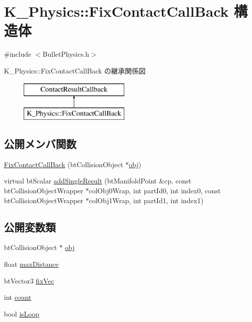 \hypertarget{struct_k___physics_1_1_fix_contact_call_back}{}\section{K\+\_\+\+Physics\+:\+:Fix\+Contact\+Call\+Back 構造体}
\label{struct_k___physics_1_1_fix_contact_call_back}


{\ttfamily \#include $<$Bullet\+Physics.\+h$>$}

K\+\_\+\+Physics\+:\+:Fix\+Contact\+Call\+Back の継承関係図\begin{figure}[H]
\begin{center}
\leavevmode
\includegraphics[height=2.000000cm]{struct_k___physics_1_1_fix_contact_call_back}
\end{center}
\end{figure}
\subsection*{公開メンバ関数}
\begin{DoxyCompactItemize}
\item 
\mbox{\hyperlink{struct_k___physics_1_1_fix_contact_call_back_aaa5c9013bf57d2196b55654bcdf360d3}{Fix\+Contact\+Call\+Back}} (bt\+Collision\+Object $\ast$\mbox{\hyperlink{struct_k___physics_1_1_fix_contact_call_back_ae632dff95a587e5cb73f5bbadf290a83}{obj}})
\item 
virtual bt\+Scalar \mbox{\hyperlink{struct_k___physics_1_1_fix_contact_call_back_ad6f9dd66fd4b001dfd4b687c18c16021}{add\+Single\+Result}} (bt\+Manifold\+Point \&cp, const bt\+Collision\+Object\+Wrapper $\ast$col\+Obj0\+Wrap, int part\+Id0, int index0, const bt\+Collision\+Object\+Wrapper $\ast$col\+Obj1\+Wrap, int part\+Id1, int index1)
\end{DoxyCompactItemize}
\subsection*{公開変数類}
\begin{DoxyCompactItemize}
\item 
bt\+Collision\+Object $\ast$ \mbox{\hyperlink{struct_k___physics_1_1_fix_contact_call_back_ae632dff95a587e5cb73f5bbadf290a83}{obj}}
\item 
float \mbox{\hyperlink{struct_k___physics_1_1_fix_contact_call_back_aba34225ba4a8474eaf9b22e9c18a1918}{max\+Distance}}
\item 
bt\+Vector3 \mbox{\hyperlink{struct_k___physics_1_1_fix_contact_call_back_a77ff8a19e7dff813ffc0831d03486411}{fix\+Vec}}
\item 
int \mbox{\hyperlink{struct_k___physics_1_1_fix_contact_call_back_a38ab6408dd65772d2db8ac20435cd4ec}{count}}
\item 
bool \mbox{\hyperlink{struct_k___physics_1_1_fix_contact_call_back_a0937fcc52b102eda9fc569acbff386c1}{is\+Loop}}
\end{DoxyCompactItemize}


